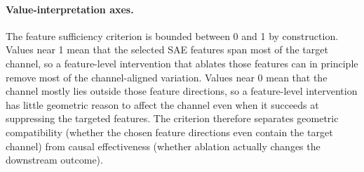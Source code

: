 \begin{table}[!htbp]
\centering
\caption{Feature sufficiency criterion (FSC) for classifier features and the full SAE dictionary relative to $\SK$ and $\SR$.
Random Mean reports the mean FSC($\SK$) from 1{,}000 random subsets of size $|$CF$|$ drawn from the full dictionary.
Percentile gives the rank of the observed FSC within the random null distribution.
Llama-3-8B is excluded because the available SAE checkpoint fails the reconstruction-quality criterion.}
\label{tab:fsc_values}
\end{table}

\paragraph{Value-interpretation axes.}
The feature sufficiency criterion is bounded between 0 and 1 by construction. Values near 1 mean that the selected SAE features span most of the target channel, so a feature-level intervention that ablates those features can in principle remove most of the channel-aligned variation. Values near 0 mean that the channel mostly lies outside those feature directions, so a feature-level intervention has little geometric reason to affect the channel even when it succeeds at suppressing the targeted features. The criterion therefore separates geometric compatibility (whether the chosen feature directions even contain the target channel) from causal effectiveness (whether ablation actually changes the downstream outcome).

